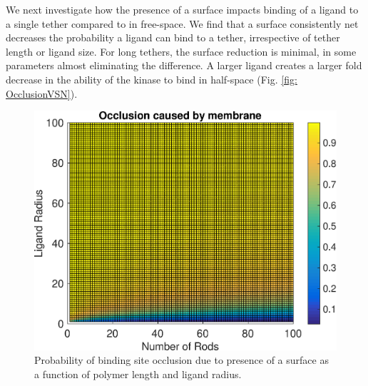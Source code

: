 \documentclass[../../AdvancementSummary.tex]{subfiles}
\begin{document}
We next investigate how the presence of a surface impacts binding of a ligand to a single tether compared to in free-space. We find that a surface consistently net decreases the probability a ligand can bind to a tether, irrespective of tether length or ligand size. For long tethers, the surface reduction is minimal, in some parameters almost eliminating the difference. A larger ligand creates a larger fold decrease in the ability of the kinase to bind in half-space (Fig. \ref{fig: OcclusionVSN}).

\begin{figure}[H]
       \begin{center}
       		\includegraphics[width=0.7\linewidth]{ResultsFigures/MembraneCausedOcclusion/MembraneCausedOcclusionVSNVSirLigand.eps}
       \end{center}
       \caption{Probability of binding site occlusion due to presence of a surface as a function of polymer length and ligand radius. \label{fig: MembraneOcclusionVSNVSR}}
\end{figure}
\end{document}
